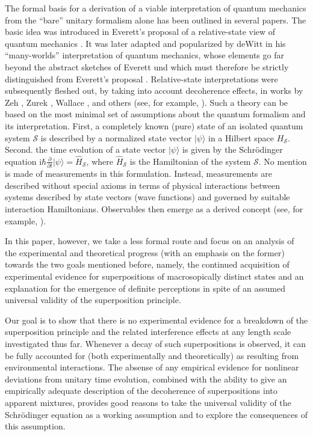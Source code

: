 \documentclass[12pt,aps,floatfix,amsmath,amssymb,showpacs,nofootinbib]{revtex4-2}
\newcommand{\ket}[1]{\ensuremath{|{#1\rangle}}}
\begin{document}
The formal basis for a derivation of a viable interpretation of
quantum mechanics from the ``bare'' unitary formalism alone has been
outlined in several papers. The basic idea was introduced in Everett's
proposal of a relative-state view of quantum mechanics
\cite{Everett:1957:rw}. It was later adapted and popularized by deWitt
\cite{DeWitt:1970:pl,DeWitt:1971:pz,DeWitt:1973:pz} in his
``many-worlds'' interpretation of quantum mechanics, whose elements go
far beyond the abstract sketches of Everett und which must therefore
be strictly distinguished from Everett's proposal \cite{Kent:1990:nm}.
Relative-state interpretations were subsequently fleshed out, by
taking into account decoherence effects, in works by Zeh
\cite{Zeh:1970:yt,Zeh:1973:wq,Zeh:2000:rr}, Zurek
\cite{Zurek:1998:re,Zurek:2002:ii,Zurek:2004:yb}, Wallace
\cite{Wallace:2003:iz,Wallace:2003:iq}, and others (see, for example,
\cite{Deutsch:1985:rx,Vaidmain:1998:zp,Donald:1999:yb}). Such a theory
can be based on the most minimal set of assumptions about the quantum
formalism and its interpretation.  First, a completely known (pure)
state of an isolated quantum system $\mathcal{S}$ is described by a
normalized state vector $\ket{\psi}$ in a Hilbert space
$H_\mathcal{S}$. Second.  the time evolution of a state vector
$\ket{\psi}$ is given by the Schr\"odinger equation $\mathrm{i}\hbar
\frac{\partial}{\partial t} \ket{\psi} = \widehat{H}_\mathcal{S}$,
where $\widehat{H}_\mathcal{S}$ is the Hamiltonian of the system
$\mathcal{S}$. No mention is made of measurements in this formulation.
Instead, measurements are described without special axioms in terms of
physical interactions between systems described by state vectors (wave
functions) and governed by suitable interaction Hamiltonians.
Observables then emerge as a derived concept
(see, for example, \cite{Joos:2003:jh,Zurek:2002:ii}).

In this paper, however, we take a less formal route and focus on an
analysis of the experimental and theoretical progress (with an
emphasis on the former) towards the two goals mentioned before,
namely, the continued acquisition of experimental evidence for
superpositions of macrosopically distinct states and an explanation
for the emergence of definite perceptions in spite of an assumed
universal validity of the superposition principle.

Our goal is to show that there is no experimental evidence for a
breakdown of the superposition principle and the related interference
effects at any length scale investigated thus far.  Whenever a decay
of such superpositions is observed, it can be fully accounted for
(both experimentally and theoretically) as resulting from
environmental interactions. The absense of any empirical evidence for
nonlinear deviations from unitary time evolution, combined with the
ability to give an empirically adequate description of the decoherence
of superpositions into apparent mixtures, provides good reasons to
take the universal validity of the Schr\"odinger equation as a working
assumption and to explore the consequences of this assumption.
\end{document}
